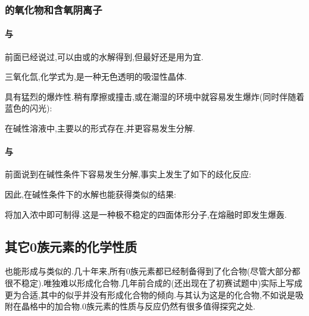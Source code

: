 \documentclass{ctexart}
\begin{document}
\subsubsection{的氧化物和含氧阴离子}
\paragraph{与}
前面已经说过,可以由或的水解得到,但最好还是用为宜.
\begin{substance}[\ce{XeO3}]
    三氧化氙,化学式为,是一种无色透明的吸湿性晶体.
\end{substance}
具有猛烈的爆炸性.稍有摩擦或撞击,或在潮湿的环境中就容易发生爆炸(同时伴随着蓝色的闪光):
\begin{center}
\end{center}
在碱性溶液中,主要以的形式存在,并更容易发生分解.
\paragraph{与}
前面说到在碱性条件下容易发生分解,事实上发生了如下的歧化反应:
\begin{center}
\end{center}
因此,在碱性条件下的水解也能获得类似的结果:
\begin{center}
\end{center}
将加入浓中即可制得.这是一种极不稳定的四面体形分子,在熔融时即发生爆轰.
\subsection{其它0族元素的化学性质}
也能形成与类似的.几十年来,所有0族元素都已经制备得到了化合物(尽管大部分都很不稳定).唯独难以形成化合物.几年前合成的(还出现在了初赛试题中)实际上写成更为合适,其中的似乎并没有形成化合物的倾向.与其认为这是的化合物,不如说是吸附在晶格中的加合物.0族元素的性质与反应仍然有很多值得探究之处.
\end{document}
